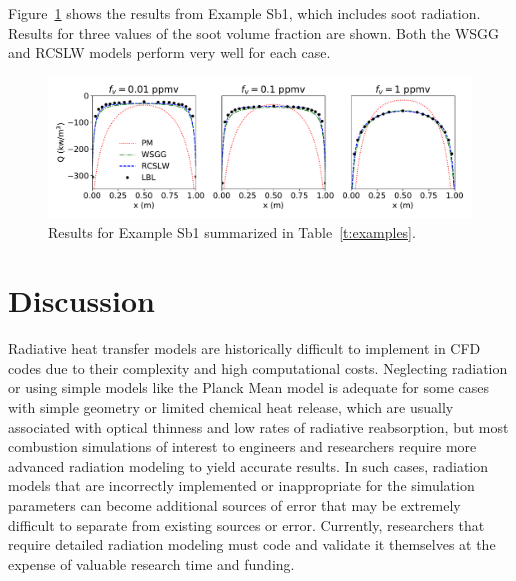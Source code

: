 \documentclass[preprint,12pt]{elsarticle}
\begin{document}
Figure~\ref{f:exSb1} shows the results from Example Sb1, which includes soot radiation. Results for three values of the soot volume fraction are shown. Both the WSGG and RCSLW models perform very well for each case. 
%
\begin{figure}
    \begin{center}
        \includegraphics[width=5.5 in]{fig_ex_Sb1.pdf}
    \caption{Results for Example Sb1 summarized in Table~\ref{t:examples}.}
    \label{f:exSb1}
    \end{center}
\end{figure}
%


\section{Discussion} \label{s:impact}


Radiative heat transfer models are historically difficult to implement in CFD codes due to their complexity and high computational costs. Neglecting radiation or using simple models like the Planck Mean model is adequate for some cases with simple geometry or limited chemical heat release, which are usually associated with optical thinness and low rates of radiative reabsorption, but most combustion simulations of interest to engineers and researchers require more advanced radiation modeling to yield accurate results. In such cases, radiation models that are incorrectly implemented or inappropriate for the simulation parameters can become additional sources of error that may be extremely difficult to separate from existing sources or error. Currently, researchers that require detailed radiation modeling must code and validate it themselves at the expense of valuable research time and funding. 
\end{document}
